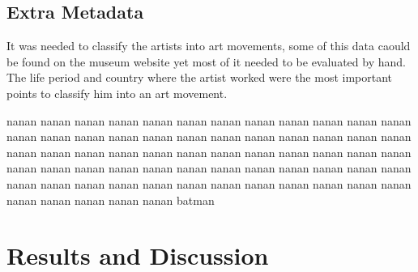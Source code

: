 \documentclass[11pt,a4paper]{report}
\begin{document}
\begin{multicols}{2}
\section{Extra Metadata}

It was needed to classify the artists into art movements, some of this data
caould be found on the museum website yet most of it needed to be evaluated by
hand.  The life period and country where the artist worked were the most
important points to classify him into an art movement.

nanan nanan nanan nanan nanan nanan nanan nanan nanan nanan nanan nanan nanan
nanan nanan nanan nanan nanan nanan nanan nanan nanan nanan nanan nanan nanan
nanan nanan nanan nanan nanan nanan nanan nanan nanan nanan nanan nanan nanan
nanan nanan nanan nanan nanan nanan nanan nanan nanan nanan nanan nanan nanan
nanan nanan nanan nanan nanan nanan nanan nanan nanan nanan nanan nanan nanan
batman

\end{multicols}

\chapter{Results and Discussion}
\end{document}
